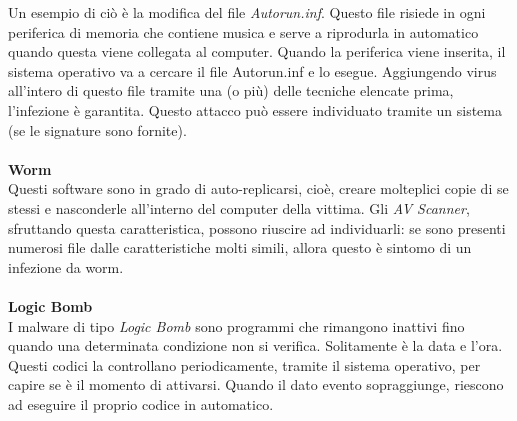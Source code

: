 Un esempio di ciò è la modifica del file \textit{Autorun.inf}. Questo file risiede in ogni periferica di memoria che contiene musica e serve a riprodurla in automatico quando questa viene collegata al computer. Quando la periferica viene inserita, il sistema operativo va a cercare il file Autorun.inf e lo esegue. Aggiungendo virus all'intero di questo file tramite una (o più) delle tecniche elencate prima, l'infezione è garantita. Questo attacco può essere individuato tramite un sistema  (se le signature sono fornite).\\
\\
\textbf{Worm}\\
Questi software sono in grado di auto-replicarsi, cioè, creare molteplici copie di se stessi e nasconderle all'interno del computer della vittima. Gli \textit{AV Scanner}, sfruttando questa caratteristica, possono riuscire ad individuarli: se sono presenti numerosi file dalle caratteristiche molti simili, allora questo è sintomo di un infezione da worm.\\
\\
\textbf{Logic Bomb}\\
I malware di tipo \textit{Logic Bomb} sono programmi che rimangono inattivi fino quando una determinata condizione non si verifica. Solitamente è la data e l'ora. Questi codici la controllano periodicamente, tramite il sistema operativo, per capire se è il momento di attivarsi. Quando il dato evento sopraggiunge, riescono ad eseguire il proprio codice in automatico.